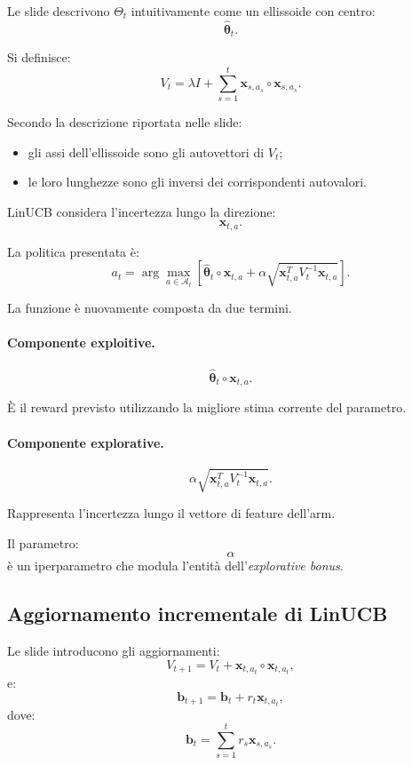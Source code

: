 Le slide descrivono $\Theta_t$ intuitivamente come un ellissoide con centro:
\[
\widehat{\boldsymbol{\theta}}_t.
\]

Si definisce:
\[
V_t
=
\lambda I
+
\sum_{s=1}^{t}
\mathbf{x}_{s,a_s}
\circ
\mathbf{x}_{s,a_s}.
\]

Secondo la descrizione riportata nelle slide:
\begin{itemize}
    \item gli assi dell'ellissoide sono gli autovettori di $V_t$;
    \item le loro lunghezze sono gli inversi dei corrispondenti autovalori.
\end{itemize}

LinUCB considera l'incertezza lungo la direzione:
\[
\mathbf{x}_{t,a}.
\]

La politica presentata è:
\[
a_t
=
\arg\max_{a\in\mathcal{A}_t}
\left[
\widehat{\boldsymbol{\theta}}_t
\circ
\mathbf{x}_{t,a}
+
\alpha
\sqrt{
\mathbf{x}_{t,a}^{T}
V_t^{-1}
\mathbf{x}_{t,a}
}
\right].
\]

La funzione è nuovamente composta da due termini.

\paragraph{Componente exploitive.}
\[
\widehat{\boldsymbol{\theta}}_t
\circ
\mathbf{x}_{t,a}.
\]

È il reward previsto utilizzando la migliore stima corrente del parametro.

\paragraph{Componente explorative.}
\[
\alpha
\sqrt{
\mathbf{x}_{t,a}^{T}
V_t^{-1}
\mathbf{x}_{t,a}
}.
\]

Rappresenta l'incertezza lungo il vettore di feature dell'arm.

Il parametro:
\[
\alpha
\]
è un iperparametro che modula l'entità dell'\emph{explorative bonus}.

\subsection{Aggiornamento incrementale di LinUCB}

Le slide introducono gli aggiornamenti:
\[
V_{t+1}
=
V_t
+
\mathbf{x}_{t,a_t}
\circ
\mathbf{x}_{t,a_t},
\]
e:
\[
\mathbf{b}_{t+1}
=
\mathbf{b}_t
+
r_t\mathbf{x}_{t,a_t},
\]
dove:
\[
\mathbf{b}_t
=
\sum_{s=1}^{t}
r_s\mathbf{x}_{s,a_s}.
\]

